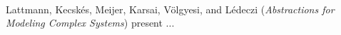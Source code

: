 

\ \hline \ %

Lattmann, Kecsk\'{e}s, Meijer,
Karsai, V\"{o}lgyesi, and L\'{e}deczi
\cite{isola-2016-lattmann}
({\em Abstractions for Modeling Complex Systems})
present ...

